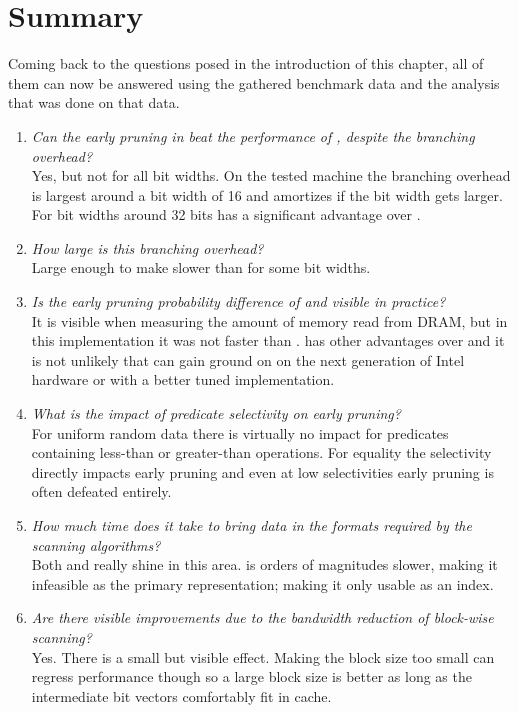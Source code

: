 \newpage
\section{Summary}

Coming back to the questions posed in the introduction of this chapter, all of
them can now be answered using the gathered benchmark data and the analysis that
was done on that data.

\begin{enumerate}
  \item \emph{Can the early pruning in \bwv{} beat the performance of
    \simdscan{}, despite the branching overhead?}\\
    Yes, but not for all bit widths.  On the tested machine the branching
    overhead is largest around a bit width of 16 and amortizes if the bit width
    gets larger. For bit widths around 32 bits \bwv{} has a significant advantage
    over \simdscan{}.
  \item \emph{How large is this branching overhead?}\\
    Large enough to make \bwv{} slower than \simdscan{} for some bit widths.
  \item \emph{Is the early pruning probability difference of \bwv{} and \bs{}
    visible in practice?}\\
    It is visible when measuring the amount of memory read from DRAM, but in this
    implementation it was not faster than \bwv{}. \bs{} has other advantages
    over \bwv{} and it is not unlikely that \bs{} can gain ground on \bwv{} on
    the next generation of Intel hardware or with a better tuned implementation.
  \item \emph{What is the impact of predicate selectivity on early pruning?}\\
    For uniform random data there is virtually no impact for predicates
    containing less-than or greater-than operations. For equality the
    selectivity directly impacts early pruning and even at low selectivities
    early pruning is often defeated entirely.
  \item \emph{How much time does it take to bring data in the formats required
    by the scanning algorithms?}\\
    Both \simdscan{} and \bs{} really shine in this area. \bwv{} is orders of
    magnitudes slower, making it infeasible as the primary representation;
    making it only usable as an index.
  \item \emph{Are there visible improvements due to the bandwidth reduction of
    block-wise scanning?}\\
    Yes. There is a small but visible effect. Making the block size too small
    can regress performance though so a large block size is better as long as
    the intermediate bit vectors comfortably fit in cache.
\end{enumerate}
